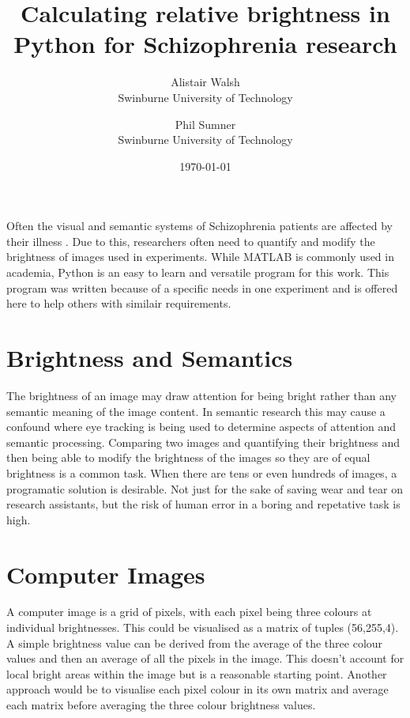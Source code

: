 \documentclass{article}
\begin{document}
\title{Calculating relative brightness in Python for Schizophrenia research}

\author{Alistair Walsh\\ Swinburne University of Technology  \and Phil Sumner\\ Swinburne University of Technology}

\date{\today}



\maketitle 






Often the visual and semantic systems of Schizophrenia patients are affected by their illness \cite{David1993263}. Due to this, researchers often need to quantify and modify the brightness of images used in experiments. While MATLAB is commonly used in academia, Python is an easy to learn and versatile program for this work. This program was written because of a specific needs in one experiment and is offered here to help others with similair requirements.

\section*{Brightness and Semantics}
The brightness of an image may draw attention for being bright rather than any semantic meaning of the image content. In semantic research this may cause a confound where eye tracking is being used to determine aspects of attention and semantic processing. Comparing two images and quantifying their brightness and then being able to modify the brightness of the images so they are of equal brightness is a common task. When there are tens or even hundreds of images, a programatic solution is desirable. Not just for the sake of saving wear and tear on research assistants, but the risk of human error in a boring and repetative task is high.

\section*{Computer Images}
A computer image is a grid of pixels, with each pixel being three colours at individual brightnesses. This could be visualised as a matrix of tuples (56,255,4). A simple brightness value can be derived from the average of the three colour values and then an average of all the pixels in the image. This doesn{'}t account for local bright areas within the image but is a reasonable starting point. Another approach would be to visualise each pixel colour in its own matrix and average each matrix before averaging the three colour brightness values.
\end{document}
